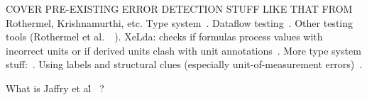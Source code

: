 COVER PRE-EXISTING ERROR DETECTION STUFF LIKE THAT FROM Rothermel,
Krishnamurthi, etc.  Type system~\cite{DBLP:conf/kbse/AhmadAGK03}. Dataflow
testing~\cite{fisher2006scaling}. Other testing tools (Rothermel et
al.\
~\cite{rothermel1998you,rothermel2001methodology,Carver:2006:EET:1159733.1159775}). XeLda:
checks if formulas process values with incorrect units or if derived
units clash with unit
annotations~\cite{Antoniu:2004:VUC:998675.999448}.  More type system
stuff:~\cite{Erwig:2005:AGM:1062455.1062494}. Using labels and
structural clues (especially unit-of-measurement errors)~\cite{Chambers:2010:RSL:1860134.1860346}.


What is Jaffry et al\. ~\cite{DBLP:journals/corr/abs-0803-1748}?

